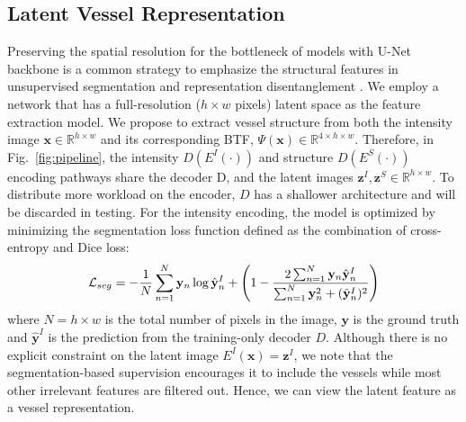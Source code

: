 \documentclass[runningheads]{llncs}
\begin{document}
\subsection{Latent Vessel Representation} \label{Sec:vesselrepresentation}
Preserving the spatial resolution for the bottleneck of models with U-Net backbone is a common strategy to emphasize the structural features in unsupervised segmentation \cite{liu2020variational,hu2021life} and representation disentanglement \cite{dewey2020disentangled,ouyang2021representation}. We employ a network that has a full-resolution ($h\times w$ pixels) latent space as the feature extraction model. We propose to extract vessel structure from both the intensity image $\mathbf{x}\in \mathbb{R}^{h\times w}$ and its corresponding BTF, $\Psi(\mathbf{x})\in \mathbb{R}^{4\times h\times w}$. Therefore, in Fig.~\ref{fig:pipeline}, the intensity $D(E^I(\cdot))$ and structure $D(E^S(\cdot))$ encoding pathways share the decoder D, and the latent images $\mathbf{z}^I,\mathbf{z}^S \in \mathbb{R}^{h\times w}$. To distribute more workload on the encoder, $D$ has a shallower architecture and will be discarded in testing. For the intensity encoding, the model is optimized by minimizing the segmentation loss function defined as the combination of cross-entropy and Dice loss:
\begin{equation}
\label{loss:segloss}
\mathcal{L}_{seg}=-\frac{1}{N}\sum_{n=1}^N\mathbf{y}_n\log\hat{\mathbf{y}}^I_n + \left(1-\frac{2\sum_{n=1}^N \mathbf{y}_n\Hat{\mathbf{y}}^I_n}{\sum_{n=1}^N \mathbf{y}_{n}^{2}+(\hat{\mathbf{y}}^I_n)^2}\right)
\end{equation}
where $N=h\times w$ is the total number of pixels in the image, $\mathbf{y}$ is the ground truth and $\hat{\mathbf{y}}^I$ is the prediction from the training-only decoder $D$. Although there is no explicit constraint on the latent image $E^I(\mathbf{x})=\mathbf{z}^I$, we note that the segmentation-based supervision encourages it to include the vessels while most other irrelevant features are filtered out. Hence, we can view the latent feature as a vessel representation. 
\end{document}
